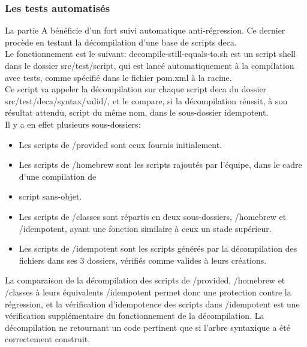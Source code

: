 \documentclass[a4paper]{article}
\begin{document}
\subsubsection{Les tests automatisés}

La partie A bénéficie d'un fort suivi automatique anti-régression. Ce dernier procède en testant la décompilation d'une base de scripts deca.\\

Le fonctionnement est le suivant: decompile-still-equals-to.sh est un script shell dans le dossier src/test/script, qui est lancé automatiquement à la compilation avec tests, comme spécifié dans le fichier pom.xml à la racine.\\
Ce script va appeler la décompilation sur chaque script deca du dossier src/test/deca/syntax/valid/, et le compare, si la décompilation réussit, à son résultat attendu, script du même nom, dans le sous-dossier idempotent.\\

Il y a en effet plusieurs sous-dossiers:\\
\begin{itemize}
\item Les scripts de /provided sont ceux fournis initialement.\\
\item Les scripts de /homebrew sont les scripts rajoutés par l'équipe, dans le cadre d'une compilation de \item script sans-objet.\\
\item Les scripts de /classes sont répartis en deux sous-dossiers, /homebrew et /idempotent, ayant une fonction similaire à ceux un stade supérieur.\\
\item Les scripts de /idempotent sont les scripts générés par la décompilation des fichiers dans ses 3 dossiers, vérifiés comme valides à leurs créations.\\
\end{itemize}

La comparaison de la décompilation des scripts de /provided, /homebrew et /classes à leurs équivalents /idempotent permet donc une protection contre la régression, et la vérification d'idempotence des scripts dans /idempotent est une vérification supplémentaire du fonctionnement de la décompilation. La décompilation ne retournant un code pertinent que si l'arbre syntaxique a été correctement construit.\\
\end{document}
